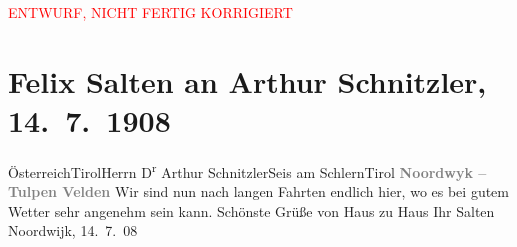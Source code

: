 
\begin{center}
            \textcolor{red}{ENTWURF, NICHT FERTIG KORRIGIERT}
                      \end{center}
            
         \renewcommand{\erwaehnteOrte}{Orte: Noordwijk, Seis am Schlern, Tirol, Österreich}
         \renewcommand{\erwaehnteWerke}{}
               \section[Felix Salten an Arthur Schnitzler, 14. 7. 1908]{ Felix Salten an Arthur Schnitzler, 14. 7. 1908}\nopagebreak{}\rehead{ }\begin{ledgroupsized}[t]{13cm}\normalsize\beginnumbering \toendnotes[C]{\smallbreak\pagebreak[2]} 
\pstart{}{\pb}Österreich\pend{}\pstart{}Tirol\pend{}\pstart{}Herrn D\textsuperscript{r} Arthur Schnitzler\pend{}\pstart{}Seis am Schlern\pend{}\pstart{}Tirol\pend{}{\bigskip}\pstart
           \noindent{}\centering{}{\pb}\textcolor{gray}{\textbf{Noordwyk – Tulpen Velden}}\pend
           \pstart
           Wir sind nun nach langen Fahrten endlich hier, wo es bei gutem Wetter sehr angenehm
               sein kann. Schönste Grüße von Haus zu Haus\pend
           \pstart Ihr \spacefill\mbox{Salten}\pend{}\pstart
           Noordwijk, 14. 7. 08\pend
           
         
         \endnumbering{}\end{ledgroupsized}\begin{anhang}\end{anhang}\newcommand{\dateiname}{L03498}\newcommand{\titel}{Felix Salten an Arthur Schnitzler, 14. 7. 1908}\newcommand{\editorInnen}{Martin Anton Müller und Laura Untner}
      